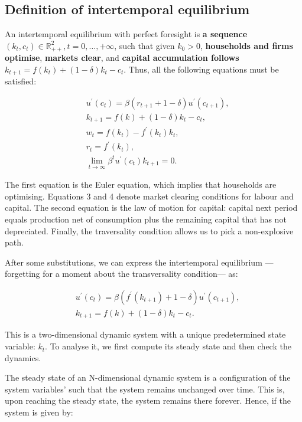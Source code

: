 \documentclass[11pt,a4paper,english]{article}
\begin{document}
\hypertarget{definition-of-intertemporal-equilibrium}{%
\subsection{Definition of intertemporal
equilibrium}\label{definition-of-intertemporal-equilibrium}}

An intertemporal equilibrium with perfect foresight is \textbf{a
sequence}
\((k_{t}, c_{t}) \in \mathbb{R}_{++}^{2}, t=0,\ldots,+\infty\), such
that given \(k_{0} > 0\), \textbf{households and firms optimise},
\textbf{markets clear}, and \textbf{capital accumulation follows}
\(k_{t+1} = f(k_{t}) + (1-\delta)k_{t} -c_{t}.\) Thus, all the following
equations must be satisfied:

\begin{eqnarray}
& u^{\prime}(c_{t}) = \beta (r_{t+1} + 1 - \delta) u^{\prime}(c_{t+1}), \\\
& k_{t+1} = f(k) + (1-\delta)k_{t} - c_{t}, \\\
& w_{t} = f(k_{t}) - f^{\prime}(k_{t})k_{t}, \\\
& r_{t} = f^{\prime}(k_{t}), \\\
& \lim_{t \rightarrow \infty} \beta^{t}u^{\prime}(c_{t})k_{t+1} = 0.
\end{eqnarray}

The first equation is the Euler equation, which implies that households
are optimising. Equations 3 and 4 denote market clearing conditions for
labour and capital. The second equation is the law of motion for
capital: capital next period equals production net of consumption plus
the remaining capital that has not depreciated. Finally, the
traversality condition allows us to pick a non-explosive path.

After some substitutions, we can express the intertemporal equilibrium
---forgetting for a moment about the transversality condition--- as:

\begin{eqnarray}
& u^{\prime}(c_{t}) = \beta (f^{\prime}(k_{t+1}) + 1 - \delta) u^{\prime}(c_{t+1}), \\\
& k_{t+1} = f(k) + (1-\delta)k_{t} - c_{t}.
\end{eqnarray}

This is a two-dimensional dynamic system with a unique predetermined
state variable: \(k_{t}.\) To analyse it, we first compute its steady
state and then check the dynamics.

The steady state of an N-dimensional dynamic system is a configuration
of the system variables' such that the system remains unchanged over
time. This is, upon reaching the steady state, the system remains there
forever. Hence, if the system is given by:
\end{document}

